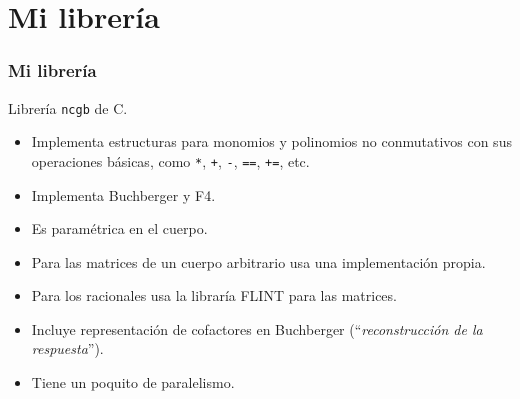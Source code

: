 \documentclass[spanish, aspectratio=169, hidecontrols]{beamer}
\newcommand\cpp{C\nolinebreak[4]\hspace{-.05em}\raisebox{.4ex}{\relsize{-3}{\textbf{++}}}\xspace}
\begin{document}
\section{Mi librería}

\begin{frame}
  \frametitle{Mi librería}
  Librería \texttt{ncgb} de \cpp.
  \pause
  \begin{itemize}
    \item Implementa estructuras para monomios y polinomios no conmutativos con sus operaciones básicas, como \texttt{*}, \texttt{+}, \texttt{-}, \texttt{==}, \texttt{+=}, etc.
    \pause
    \item Implementa Buchberger y F4.
    \pause
    \item Es \alert{paramétrica en el cuerpo}.
    \pause
    \item Para las matrices de un cuerpo arbitrario usa una implementación propia.
    \pause
    \item Para los racionales usa la libraría FLINT para las matrices. %
    \pause
    \item Incluye \alert{representación de cofactores} en Buchberger (``\textit{reconstrucción de la respuesta}'').
    \pause
    \item Tiene un poquito de paralelismo.
  \end{itemize}
\end{frame}
\end{document}
